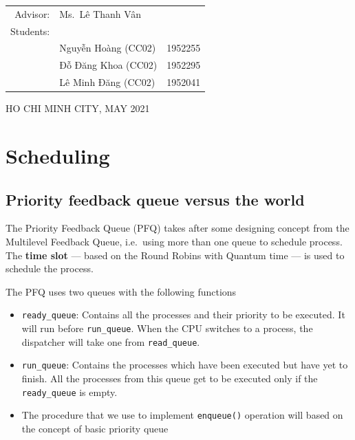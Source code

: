 \documentclass[a4paper]{article}
\numberwithin{equation}{section}
\begin{document}
\begin{titlepage}
  \begin{table}[h]
    \begin{tabular}{rll}
      \hspace{1cm} Advisor:  & Ms.\ Lê Thanh Vân             \\
      \hspace{1cm} Students: &                               \\
                             & Nguyễn Hoàng (CC02) & 1952255 \\
                             & Đỗ Đăng Khoa (CC02) & 1952295 \\
                             & Lê Minh Đăng (CC02) & 1952041 \\
    \end{tabular}
  \end{table}

  \begin{center}
    {\footnotesize HO CHI MINH CITY, MAY 2021}
  \end{center}
\end{titlepage}



\newpage
\tableofcontents

\newpage
\section{Scheduling}
\subsection{Priority feedback queue versus the world}
The Priority Feedback Queue (PFQ) takes after some designing concept from the Multilevel Feedback Queue, i.e.\ using more than one queue to schedule process.
The \textbf{time slot} --- based on the Round Robins with Quantum time --- is used to schedule the process.

The PFQ uses two queues with the following functions
\begin{itemize}
  \item \texttt{ready_queue}: Contains all the processes and their priority to be executed.
        It will run before \texttt{run_queue}.
        When the CPU switches to a process, the dispatcher will take one from \texttt{read_queue}.

  \item \texttt{run_queue}: Contains the processes which have been executed but have yet to finish.
        All the processes from this queue get to be executed only if the \texttt{ready_queue} is empty.

  \item The procedure that we use to implement \texttt{enqueue()} operation will based on the concept of basic priority queue
\end{itemize}
\end{document}
